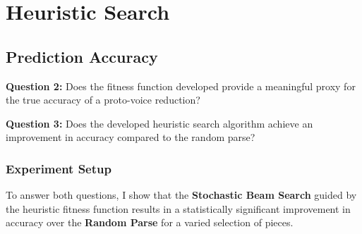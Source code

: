 \documentclass[12pt,a4paper,twoside,openany]{report} \usepackage[pdfborder={0 0 0}]{hyperref}    %
\theoremstyle{definition} \newtheorem{definition}{Definition}[section]
\begin{document}

  \section{Heuristic Search} 
  \label{sec:evalBaseline}

  \subsection{Prediction Accuracy}
  \label{sub:evalExtAcc}
  \textbf{Question 2:} Does the fitness function developed provide a meaningful proxy for the true accuracy of
  a proto-voice reduction?

  \textbf{Question 3:} Does the developed heuristic search algorithm achieve an improvement in accuracy compared to the random parse?
  \subsubsection{Experiment Setup}
  To answer both questions, I show that the \textbf{Stochastic Beam Search} guided by the heuristic fitness function
  results in a statistically significant improvement in accuracy over the \textbf{Random Parse} for a varied selection of pieces.
\end{document}
